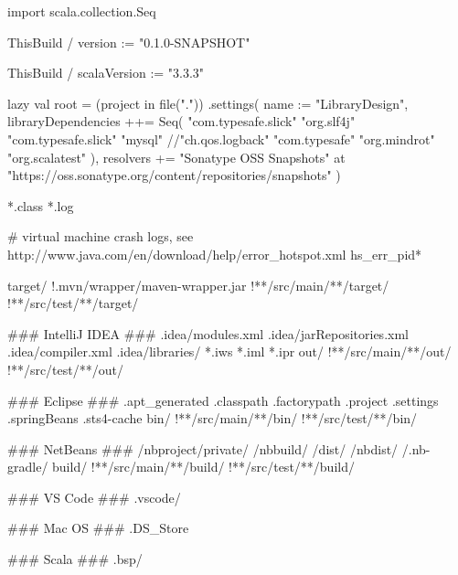 import scala.collection.Seq

ThisBuild / version := "0.1.0-SNAPSHOT"

ThisBuild / scalaVersion := "3.3.3"

lazy val root = (project in file("."))
  .settings(
    name := "LibraryDesign",
    libraryDependencies ++= Seq(
      "com.typesafe.slick" %
      "org.slf4j" %
      "com.typesafe.slick" %
      "mysql" %
      //"ch.qos.logback" %
      "com.typesafe" %
      "org.mindrot" %
      "org.scalatest" %
    ),
    resolvers += "Sonatype OSS Snapshots" at "https://oss.sonatype.org/content/repositories/snapshots"
  )


*.class
*.log

# virtual machine crash logs, see http://www.java.com/en/download/help/error_hotspot.xml
hs_err_pid*


target/
!.mvn/wrapper/maven-wrapper.jar
!**/src/main/**/target/
!**/src/test/**/target/

### IntelliJ IDEA ###
.idea/modules.xml
.idea/jarRepositories.xml
.idea/compiler.xml
.idea/libraries/
*.iws
*.iml
*.ipr
out/
!**/src/main/**/out/
!**/src/test/**/out/

### Eclipse ###
.apt_generated
.classpath
.factorypath
.project
.settings
.springBeans
.sts4-cache
bin/
!**/src/main/**/bin/
!**/src/test/**/bin/

### NetBeans ###
/nbproject/private/
/nbbuild/
/dist/
/nbdist/
/.nb-gradle/
build/
!**/src/main/**/build/
!**/src/test/**/build/

### VS Code ###
.vscode/

### Mac OS ###
.DS_Store

### Scala ###
.bsp/